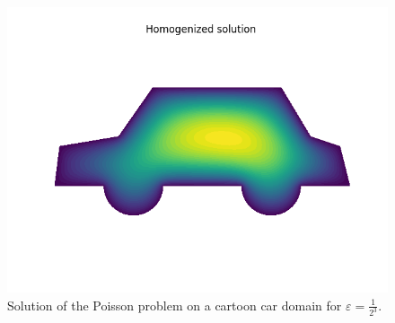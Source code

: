 \documentclass{article}
\renewcommand{\epsilon}{\varepsilon}
\begin{document}
  \begin{figure}[h]
    \centering
    \includegraphics[width=0.8\linewidth]{car_homogenized.png}
    \caption{Solution of the Poisson problem on a cartoon car domain for $\epsilon = \frac{1}{2^3}$.}
    \label{fig:car_homogenized}
  \end{figure}
  
\end{document}
